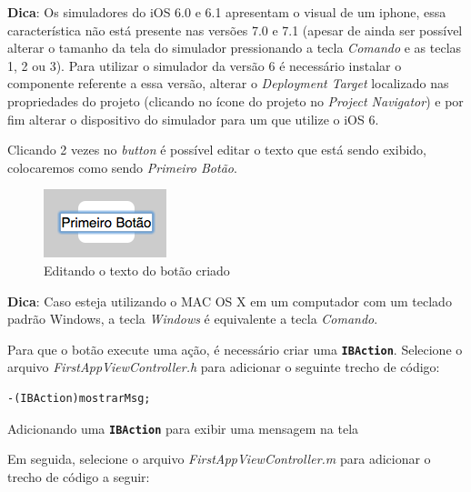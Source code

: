 \documentclass[a4paper,12pt,brazil,oneside]{book}
\begin{document}
\begin{framed}

\textbf{Dica}: Os simuladores do iOS 6.0 e 6.1 apresentam o visual de um iphone, essa característica não está presente nas versões 7.0 e 7.1 (apesar de ainda ser possível alterar o tamanho da tela do simulador pressionando a tecla \textit{Comando} e as teclas 1, 2 ou 3). Para utilizar o simulador da versão 6 é necessário instalar o componente referente a essa versão, alterar o \textit{Deployment Target} localizado nas propriedades do projeto (clicando no ícone do projeto no \textit{Project Navigator}) e por fim alterar o dispositivo do simulador para um que utilize o iOS 6.\end{framed}


Clicando 2 vezes no \emph{button} é possível editar o texto que está sendo exibido, colocaremos como sendo \emph{Primeiro Botão}.

\begin{figure}[H]
  \centering
  \includegraphics[scale=0.7]{figuras/3/tela_novo_projeto_20.png}
  \caption{Editando o texto do botão criado}
  \label{fig:a}
\end{figure}

\begin{framed}

\textbf{Dica}: Caso esteja utilizando o MAC OS X em um computador com um teclado padrão Windows, a tecla \textit{Windows }é equivalente a tecla \textit{Comando}.
\end{framed}

Para que o botão execute uma ação, é necessário criar uma \texttt{\textbf{IBAction}}. Selecione o arquivo \emph{FirstAppViewController.h} para adicionar o seguinte trecho de código:

\begin{listing}
\begin{verbatim}
-(IBAction)mostrarMsg;
\end{verbatim}
\caption{Adicionando uma \texttt{\textbf{IBAction}} para exibir uma mensagem na tela}
\end{listing}

Em seguida, selecione o arquivo \emph{FirstAppViewController.m} para adicionar o  trecho de código a seguir:
\end{document}
